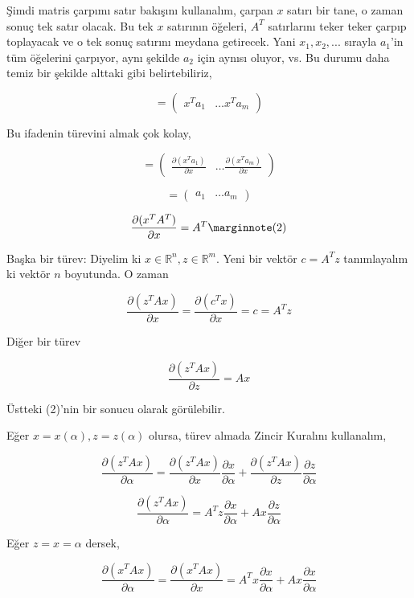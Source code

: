 \documentclass[12pt,fleqn]{article}\usepackage{../../common}
\begin{document}
Şimdi matris çarpımı satır bakışını kullanalım, çarpan $x$ satırı bir
tane, o zaman sonuç tek satır olacak. Bu tek $x$ satırının öğeleri, $A^T$
satırlarını teker teker çarpıp toplayacak ve o tek sonuç satırını meydana
getirecek. Yani $x_1,x_2,...$ sırayla $a_1$'in tüm öğelerini çarpıyor,
aynı şekilde $a_2$ için aynısı oluyor, vs. Bu durumu daha temiz bir
şekilde alttaki gibi belirtebiliriz,

$$ 
= \left(\begin{array}{ccc}
x^Ta_1 & \dots x^Ta_m 
\end{array}\right)
$$

Bu ifadenin türevini almak çok kolay, 

$$ 
= \left(\begin{array}{ccc}
\frac{\partial (x^Ta_1)}{\partial x} &
\dots
\frac{\partial (x^Ta_m)}{\partial x} 
\end{array}\right)
$$

$$ 
= \left(\begin{array}{ccc}
a_1 & \dots a_m 
\end{array}\right)
$$

$$ 
\frac{\partial (x^TA^T)}{\partial x} = A^T 
\mlabel{2} 
$$

Başka bir türev: Diyelim ki $x \in \mathbb{R}^n, z \in \mathbb{R}^m$. 
Yeni bir vektör $c = A^Tz$ tanımlayalım ki vektör $n$ boyutunda. O zaman 

$$ 
\frac{\partial (z^TAx)}{\partial x} =  
\frac{\partial (c^Tx)}{\partial x} = c =  A^Tz
$$

Diğer bir türev

$$ 
\frac{\partial (z^TAx)}{\partial z} =  Ax
$$

Üstteki (2)'nin bir sonucu olarak görülebilir.

Eğer $x=x(\alpha),z=z(\alpha)$ olursa, türev almada Zincir Kuralını kullanalım,

$$ 
\frac{\partial (z^TAx)}{\partial \alpha} =  
\frac{\partial (z^TAx)}{\partial x} \frac{\partial x}{\partial \alpha}  + 
\frac{\partial (z^TAx)}{\partial z} \frac{\partial z}{\partial \alpha}  
$$

$$ 
\frac{\partial (z^TAx)}{\partial \alpha} =  
A^Tz \frac{\partial x}{\partial \alpha}  + 
Ax \frac{\partial z}{\partial \alpha}  
$$

Eğer $z = x = \alpha$ dersek,

$$ 
\frac{\partial (x^TAx)}{\partial \alpha} =  
\frac{\partial (x^TAx)}{\partial x} =  
A^Tx \frac{\partial x}{\partial \alpha}  + 
Ax \frac{\partial x}{\partial \alpha}  
$$
\end{document}
